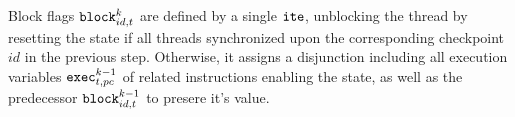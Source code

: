 

\noindent
Block flags $\texttt{block}^k_{id, t}$ are defined by a single $\texttt{ite}$, unblocking the thread by resetting the state if all threads synchronized upon the corresponding checkpoint $id$ in the previous step. %
Otherwise, it assigns a disjunction including all execution variables $\texttt{exec}^{k - 1}_{t, pc}$ of related  instructions enabling the state, as well as the predecessor $\texttt{block}^{k - 1}_{id, t}$ to presere it's value.

